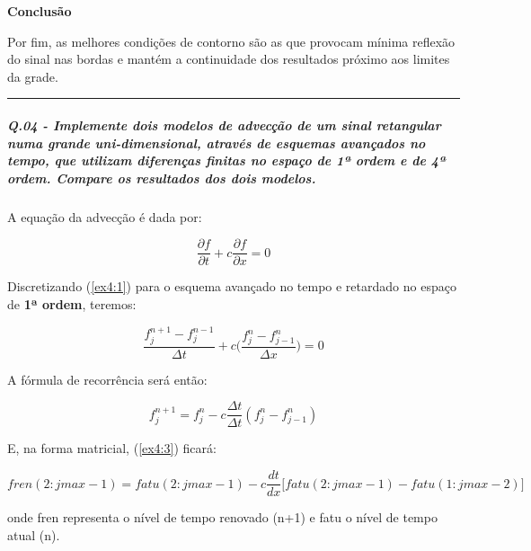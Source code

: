 \documentclass[11pt]{article}
\begin{document}
\textbf{Conclusão}

Por fim, as melhores condições de contorno são as que provocam mínima
reflexão do sinal nas bordas e mantém a continuidade dos resultados
próximo aos limites da grade.

    \begin{center}\rule{0.5\linewidth}{\linethickness}\end{center}

    \subparagraph{Q.04 - Implemente dois modelos de advecção de um sinal
retangular numa grande uni-dimensional, através de esquemas avançados no
tempo, que utilizam diferenças finitas no espaço de 1ª ordem e de 4ª
ordem. Compare os resultados dos dois
modelos.}\label{q.04---implemente-dois-modelos-de-advecuxe7uxe3o-de-um-sinal-retangular-numa-grande-uni-dimensional-atravuxe9s-de-esquemas-avanuxe7ados-no-tempo-que-utilizam-diferenuxe7as-finitas-no-espauxe7o-de-1uxaa-ordem-e-de-4uxaa-ordem.-compare-os-resultados-dos-dois-modelos.}

A equação da advecção é dada por:

\begin{equation}
    \frac{\partial{f}}{\partial{t}} + c\frac{\partial{f}}{\partial{x}} = 0
    \label{ex4:1}
\end{equation}

Discretizando (\ref{ex4:1}) para o esquema avançado no tempo e retardado
no espaço de \textbf{1ª ordem}, teremos:

\begin{equation}
    \frac{f^{n+1}_{j} - f^{n-1}_{j}}{\Delta{t}} + c\Biggl( \frac{f^{n}_{j} - f^{n}_{j-1}}{\Delta{x}} \Biggl) = 0
    \label{ex4:2}
\end{equation}

A fórmula de recorrência será então:

\begin{equation}
    f^{n+1}_{j} = f^{n}_{j} - c\frac{\Delta{t}}{\Delta{t}}(f^{n}_{j} - f^{n}_{j-1})
    \label{ex4:3}
\end{equation}

E, na forma matricial, (\ref{ex4:3}) ficará:

\begin{equation}
fren(2:jmax-1) = fatu(2:jmax-1) - c\frac{dt}{dx}\biggr[ fatu(2:jmax-1) - fatu(1:jmax-2) \biggr]
\label{ex4:4}
\end{equation}

onde fren representa o nível de tempo renovado (n+1) e fatu o nível de
tempo atual (n).
\end{document}
